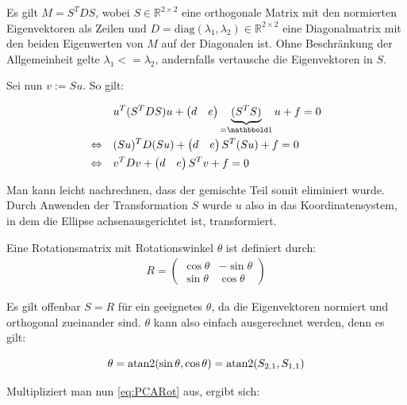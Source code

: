 Es gilt $M = S^TDS$, wobei $S\in\mathbb{R}^{2\times2}$ eine orthogonale Matrix mit den normierten Eigenvektoren als Zeilen und $D = \text{diag}(\lambda_1, \lambda_2)\in\mathbb{R}^{2\times2}$ eine Diagonalmatrix mit den beiden Eigenwerten von $M$ auf der Diagonalen ist. Ohne Beschränkung der Allgemeinheit gelte $\lambda_1 <= \lambda_2$, andernfalls vertausche die Eigenvektoren in $S$. 

Sei nun $v := Su$.
So gilt:

\begin{equation} \label{eq:PCARot}
\begin{aligned}
&u^T(S^TDS)u +\begin{pmatrix}d & e\end{pmatrix}\underbrace{(S^TS)}_{=\ind}u + f = 0 \\
\Leftrightarrow\quad &(Su)^TD(Su) +\begin{pmatrix}d & e\end{pmatrix}S^T(Su) + f = 0 \\
\Leftrightarrow\quad &v^{T}Dv +\begin{pmatrix}d & e\end{pmatrix}S^Tv + f = 0 
\end{aligned}
\end{equation}

Man kann leicht nachrechnen, dass der gemischte Teil somit eliminiert wurde. Durch Anwenden der Transformation $S$ wurde $u$ also in das Koordinatensystem, in dem die Ellipse achsenausgerichtet ist,  transformiert.

Eine Rotationsmatrix mit Rotationswinkel $\theta$ ist definiert durch: 
\begin{equation}
\begin{aligned}
R = \begin{pmatrix}\cos\theta & -\sin\theta \\ \sin\theta & \cos\theta\end{pmatrix}
\end{aligned}
\end{equation}

Es gilt offenbar $S = R$ für ein geeignetes $\theta$, da die Eigenvektoren normiert und orthogonal zueinander sind. $\theta$ kann also einfach ausgerechnet werden, denn es gilt:

\begin{equation*}
\theta = \text{atan2}(\sin\theta, \cos\theta) = \text{atan2}(S_{2,1}, S_{1,1})
\end{equation*}

Multipliziert man nun \ref{eq:PCARot} aus, ergibt sich:

